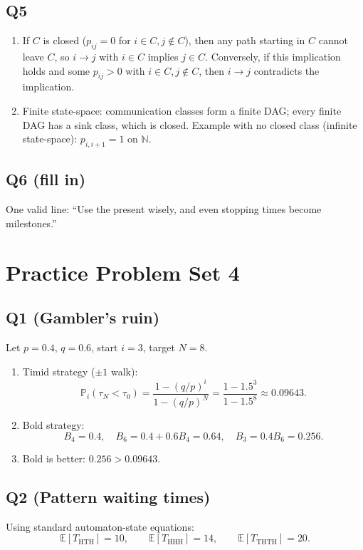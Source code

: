 \documentclass[11pt]{article}
\newcommand{\PP}{\mathbb{P}}
\newcommand{\EE}{\mathbb{E}}
\newcommand{\1}{\mathbf{1}}
\begin{document}
\subsection*{Q5}
\begin{enumerate}[label=(\alph*)]
\item If $C$ is closed ($p_{ij}=0$ for $i\in C,j\notin C$), then any path starting in $C$ cannot leave $C$, so $i\to j$ with $i\in C$ implies $j\in C$. Conversely, if this implication holds and some $p_{ij}>0$ with $i\in C,j\notin C$, then $i\to j$ contradicts the implication.
\item Finite state-space: communication classes form a finite DAG; every finite DAG has a sink class, which is closed. Example with no closed class (infinite state-space): $p_{i,i+1}=1$ on $\mathbb N$.
\end{enumerate}

\subsection*{Q6 (fill in)}
One valid line: ``Use the present wisely, and even stopping times become milestones.''

\section{Practice Problem Set 4}

\subsection*{Q1 (Gambler's ruin)}
Let $p=0.4$, $q=0.6$, start $i=3$, target $N=8$.
\begin{enumerate}[label=(\alph*)]
\item Timid strategy ($\pm1$ walk):
\[
\PP_i(\tau_N<\tau_0)=\frac{1-(q/p)^i}{1-(q/p)^N}
=\frac{1-1.5^3}{1-1.5^8}\approx0.09643.
\]
\item Bold strategy:
\[
B_4=0.4,\quad B_6=0.4+0.6B_4=0.64,\quad B_3=0.4B_6=0.256.
\]
\item Bold is better: $0.256>0.09643$.
\end{enumerate}

\subsection*{Q2 (Pattern waiting times)}
Using standard automaton-state equations:
\[
\EE[T_{\text{HTH}}]=10,\qquad \EE[T_{\text{HHH}}]=14,\qquad \EE[T_{\text{THTH}}]=20.
\]
\end{document}
